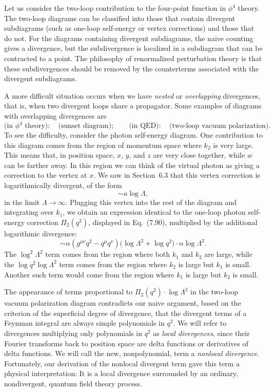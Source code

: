 Let us consider the two-loop contribution to the four-point function in
$\phi^4$ theory.  The two-loop diagrams can be classified into those that
contain divergent subdiagrams (such as one-loop self-energy or vertex
corrections) and those that do not.  For the diagrams containing divergent
subdiagrams, the naive counting gives a divergence, but the subdivergence is
localized in a subdiagram that can be contracted to a point.  The philosophy of
renormalized perturbation theory is that these subdivergences should be
removed by the counterterms associated with the divergent subdiagrams.

A more difficult situation occurs when we have \emph{nested} or
\emph{overlapping} divergences, that is, when two divergent loops share a
propagator.  Some examples of diagrams with overlapping divergences are
\begin{equation}
  \text{(in } \phi^4 \text{ theory)}:\quad \text{(sunset diagram)};\qquad
  \text{(in QED)}:\quad \text{(two-loop vacuum polarization)} .
\end{equation}
To see the difficulty, consider the photon self-energy diagram.  One
contribution to this diagram comes from the region of momentum space where
$k_2$ is very large.  This means that, in position space, $x$, $y$, and $z$ are
very close together, while $w$ can be farther away.  In this region we can
think of the virtual photon as giving a correction to the vertex at $x$.  We
saw in Section~6.3 that this vertex correction is logarithmically divergent,
of the form
\begin{equation}
  \sim a\log\Lambda ,
\end{equation}
in the limit $\Lambda\to\infty$.  Plugging this vertex into the rest of the
diagram and integrating over $k_1$, we obtain an expression identical to the
one-loop photon self-energy correction $\Pi_2(q^2)$, displayed in
Eq.~(7.90), multiplied by the additional logarithmic divergence:
\begin{equation}
  \sim \alpha(g^{\mu\nu}q^2 - q^\mu q^\nu)\bigl( \log\Lambda^2
    + \log q^2 \bigr)\cdot\alpha\log\Lambda^2 .
  \label{eq:10.50}
\end{equation}
The $\log^2\Lambda^2$ term comes from the region where both $k_1$ and $k_2$
are large, while the $\log q^2\log\Lambda^2$ term comes from the region where
$k_2$ is large but $k_1$ is small.  Another such term would come from the
region where $k_1$ is large but $k_2$ is small.

The appearance of terms proportional to $\Pi_2(q^2)\cdot\log\Lambda^2$ in the
two-loop vacuum polarization diagram contradicts our naive argument, based on
the criterion of the superficial degree of divergence, that the divergent
terms of a Feynman integral are always simple polynomials in $q^2$.  We will
refer to divergences multiplying only polynomials in $q^2$ as \emph{local
divergences}, since their Fourier transforms back to position space are delta
functions or derivatives of delta functions.  We will call the new,
nonpolynomial, term a \emph{nonlocal divergence}.  Fortunately, our derivation
of the nonlocal divergent term gave this term a physical interpretation: It is
a local divergence surrounded by an ordinary, nondivergent, quantum field
theory process.

